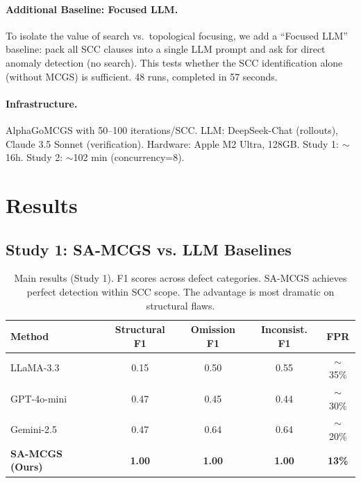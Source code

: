 \documentclass{article}
\begin{document}
\paragraph{Additional Baseline: Focused LLM.} To isolate the value of search vs.\ topological focusing, we add a ``Focused LLM'' baseline: pack all SCC clauses into a single LLM prompt and ask for direct anomaly detection (no search). This tests whether the SCC identification alone (without MCGS) is sufficient. 48 runs, completed in 57 seconds.

\paragraph{Infrastructure.} AlphaGoMCGS with 50--100 iterations/SCC. LLM: DeepSeek-Chat (rollouts), Claude 3.5 Sonnet (verification). Hardware: Apple M2 Ultra, 128GB. Study 1: $\sim$16h. Study 2: $\sim$102 min (concurrency=8).

\section{Results}

\subsection{Study 1: SA-MCGS vs. LLM Baselines}

\begin{table}[t]
\caption{Main results (Study 1). F1 scores across defect categories. SA-MCGS achieves perfect detection within SCC scope. The advantage is most dramatic on structural flaws.}
\label{tab:main}
\centering
\small
\begin{tabular}{lcccc}
\toprule
\textbf{Method} & \textbf{Structural F1} & \textbf{Omission F1} & \textbf{Inconsist. F1} & \textbf{FPR} \\
\midrule
LLaMA-3.3 & 0.15 & 0.50 & 0.55 & $\sim$35\% \\
GPT-4o-mini & 0.47 & 0.45 & 0.44 & $\sim$30\% \\
Gemini-2.5 & 0.47 & 0.64 & 0.64 & $\sim$20\% \\
\midrule
\textbf{SA-MCGS (Ours)} & \textbf{1.00} & \textbf{1.00} & \textbf{1.00} & \textbf{13\%} \\
\bottomrule
\end{tabular}
\end{table}
\end{document}
